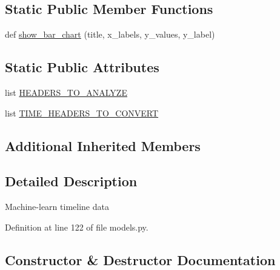 \subsection*{Static Public Member Functions}
\begin{DoxyCompactItemize}
\item 
def \hyperlink{classpygce_1_1analysis_1_1models_1_1_timeline_data_analysis_a20cb1d0d2f9d1ccb640d36c5ae112311}{show\+\_\+bar\+\_\+chart} (title, x\+\_\+labels, y\+\_\+values, y\+\_\+label)
\end{DoxyCompactItemize}
\subsection*{Static Public Attributes}
\begin{DoxyCompactItemize}
\item 
list \hyperlink{classpygce_1_1analysis_1_1models_1_1_timeline_data_analysis_abc835b2b9b9d8555a2b49e8534782021}{H\+E\+A\+D\+E\+R\+S\+\_\+\+T\+O\+\_\+\+A\+N\+A\+L\+Y\+ZE}
\item 
list \hyperlink{classpygce_1_1analysis_1_1models_1_1_timeline_data_analysis_afaebf4ce7e847ff4c32a7b9b799fd94d}{T\+I\+M\+E\+\_\+\+H\+E\+A\+D\+E\+R\+S\+\_\+\+T\+O\+\_\+\+C\+O\+N\+V\+E\+RT}
\end{DoxyCompactItemize}
\subsection*{Additional Inherited Members}


\subsection{Detailed Description}
\begin{DoxyVerb}Machine-learn timeline data \end{DoxyVerb}
 

Definition at line 122 of file models.\+py.



\subsection{Constructor \& Destructor Documentation}
